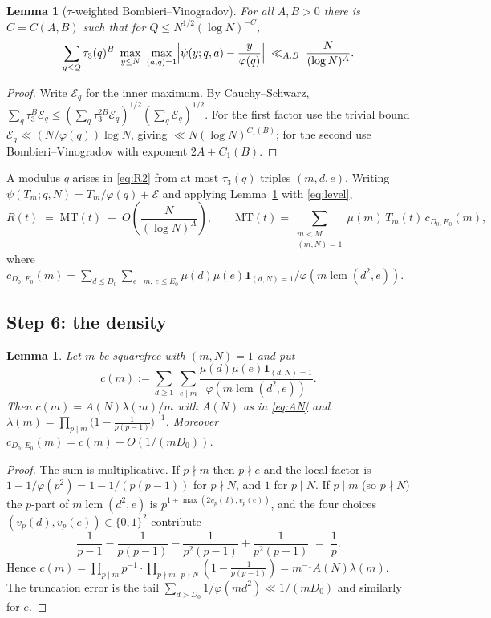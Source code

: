 \documentclass[11pt,a4paper]{article}
\theoremstyle{plain}
\newtheorem{lemma}[theorem]{Lemma}
\theoremstyle{definition}
\DeclareMathOperator{\lcm}{lcm}
\begin{document}
\begin{lemma}[$\tau$-weighted Bombieri--Vinogradov]\label{lem:BV}
For all $A,B>0$ there is $C=C(A,B)$ such that for
$Q\le N^{1/2}(\log N)^{-C}$,
\[
  \sum_{q\le Q}\tau_3(q)^{B}\ \max_{y\le N}\ \max_{(a,q)=1}
  \Bigl|\psi(y;q,a)-\frac{y}{\varphi(q)}\Bigr|
  \;\ll_{A,B}\; \frac{N}{(\log N)^{A}} .
\]
\end{lemma}

\begin{proof}
Write $\mathcal E_q$ for the inner maximum. By Cauchy--Schwarz,
$\sum_q\tau_3^B\mathcal E_q\le
(\sum_q\tau_3^{2B}\mathcal E_q)^{1/2}(\sum_q\mathcal E_q)^{1/2}$.
For the first factor use the trivial bound
$\mathcal E_q\ll (N/\varphi(q))\log N$, giving
$\ll N(\log N)^{C_1(B)}$; for the second use Bombieri--Vinogradov with
exponent $2A+C_1(B)$.
\end{proof}

A modulus $q$ arises in \eqref{eq:R2} from at most $\tau_3(q)$ triples
$(m,d,e)$. Writing $\psi(T_m;q,N)=T_m/\varphi(q)+\mathcal E$ and applying
Lemma~\ref{lem:BV} with \eqref{eq:level},
\begin{equation}\label{eq:R3}
  R(t) \;=\; \mathrm{MT}(t) \;+\; O\!\left(\frac{N}{(\log N)^{A}}\right),
  \qquad
  \mathrm{MT}(t)=\sum_{\substack{m<M\\ (m,N)=1}}\mu(m)\,T_m(t)\,c_{D_0,E_0}(m),
\end{equation}
where
$c_{D_0,E_0}(m)=\sum_{d\le D_0}\sum_{e\mid m,\,e\le E_0}
\mu(d)\mu(e)\mathbf 1_{(d,N)=1}/\varphi(m\lcm(d^2,e))$.

\subsection{Step 6: the density}

\begin{lemma}\label{lem:density}
Let $m$ be squarefree with $(m,N)=1$ and put
\[
  c(m):=\sum_{d\ge1}\ \sum_{e\mid m}
     \frac{\mu(d)\mu(e)\mathbf 1_{(d,N)=1}}{\varphi(m\lcm(d^2,e))} .
\]
Then $c(m)=A(N)\lambda(m)/m$ with $A(N)$ as in \eqref{eq:AN} and
$\lambda(m)=\prod_{p\mid m}\bigl(1-\tfrac{1}{p(p-1)}\bigr)^{-1}$.
Moreover $c_{D_0,E_0}(m)=c(m)+O(1/(mD_0))$.
\end{lemma}

\begin{proof}
The sum is multiplicative. If $p\nmid m$ then $p\nmid e$ and the local
factor is $1-1/\varphi(p^2)=1-1/(p(p-1))$ for $p\nmid N$, and $1$ for
$p\mid N$. If $p\mid m$ (so $p\nmid N$) the $p$-part of
$m\lcm(d^2,e)$ is $p^{1+\max(2v_p(d),v_p(e))}$, and the four choices
$(v_p(d),v_p(e))\in\{0,1\}^2$ contribute
\[
  \frac{1}{p-1}-\frac{1}{p(p-1)}-\frac{1}{p^2(p-1)}+\frac{1}{p^2(p-1)}
  \;=\;\frac{1}{p}.
\]
Hence $c(m)=\prod_{p\mid m}p^{-1}\cdot
\prod_{p\nmid m,\ p\nmid N}(1-\tfrac{1}{p(p-1)})
= m^{-1}A(N)\lambda(m)$. The truncation error is the tail
$\sum_{d>D_0}1/\varphi(md^2)\ll 1/(mD_0)$ and similarly for $e$.
\end{proof}
\end{document}
